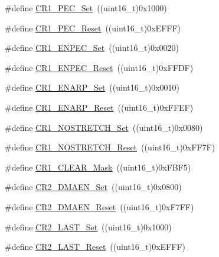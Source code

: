 \begin{DoxyCompactItemize}
\item 
\#define \hyperlink{group___i2_c___private___defines_gad0ab853d291338d4cf3aee736353f0b8}{C\+R1\+\_\+\+P\+E\+C\+\_\+\+Set}~((uint16\+\_\+t)0x1000)
\item 
\#define \hyperlink{group___i2_c___private___defines_gabb6969dfa44c3539ef93f04f8136c3c7}{C\+R1\+\_\+\+P\+E\+C\+\_\+\+Reset}~((uint16\+\_\+t)0x\+E\+F\+F\+F)
\item 
\#define \hyperlink{group___i2_c___private___defines_ga7fdf69341e5debc3244812012ae332e6}{C\+R1\+\_\+\+E\+N\+P\+E\+C\+\_\+\+Set}~((uint16\+\_\+t)0x0020)
\item 
\#define \hyperlink{group___i2_c___private___defines_gabd33104d7b8e4673fa330f4ca3a97e44}{C\+R1\+\_\+\+E\+N\+P\+E\+C\+\_\+\+Reset}~((uint16\+\_\+t)0x\+F\+F\+D\+F)
\item 
\#define \hyperlink{group___i2_c___private___defines_ga73cfd7b486b4279fc6a83de64ab23985}{C\+R1\+\_\+\+E\+N\+A\+R\+P\+\_\+\+Set}~((uint16\+\_\+t)0x0010)
\item 
\#define \hyperlink{group___i2_c___private___defines_ga173b065ec9b7b33c0fa0bf71c0fa2207}{C\+R1\+\_\+\+E\+N\+A\+R\+P\+\_\+\+Reset}~((uint16\+\_\+t)0x\+F\+F\+E\+F)
\item 
\#define \hyperlink{group___i2_c___private___defines_gac4abee43c3523527780f200adf465bc0}{C\+R1\+\_\+\+N\+O\+S\+T\+R\+E\+T\+C\+H\+\_\+\+Set}~((uint16\+\_\+t)0x0080)
\item 
\#define \hyperlink{group___i2_c___private___defines_ga9a1609fd4bbcc38fc6423836730c8fa0}{C\+R1\+\_\+\+N\+O\+S\+T\+R\+E\+T\+C\+H\+\_\+\+Reset}~((uint16\+\_\+t)0x\+F\+F7\+F)
\item 
\#define \hyperlink{group___i2_c___private___defines_ga67f7dd35ea3d1296677e5fc50b88fa90}{C\+R1\+\_\+\+C\+L\+E\+A\+R\+\_\+\+Mask}~((uint16\+\_\+t)0x\+F\+B\+F5)
\item 
\#define \hyperlink{group___i2_c___private___defines_gafe82da50fa03bd5ecb36340da64c87ca}{C\+R2\+\_\+\+D\+M\+A\+E\+N\+\_\+\+Set}~((uint16\+\_\+t)0x0800)
\item 
\#define \hyperlink{group___i2_c___private___defines_gabe742f89a768e29b9a2d86f7782991a6}{C\+R2\+\_\+\+D\+M\+A\+E\+N\+\_\+\+Reset}~((uint16\+\_\+t)0x\+F7\+F\+F)
\item 
\#define \hyperlink{group___i2_c___private___defines_ga3604dd2f23b0f15a088ef6fe9731485a}{C\+R2\+\_\+\+L\+A\+S\+T\+\_\+\+Set}~((uint16\+\_\+t)0x1000)
\item 
\#define \hyperlink{group___i2_c___private___defines_ga904e044226182269485936bad8314f84}{C\+R2\+\_\+\+L\+A\+S\+T\+\_\+\+Reset}~((uint16\+\_\+t)0x\+E\+F\+F\+F)

\end{DoxyCompactItemize}

